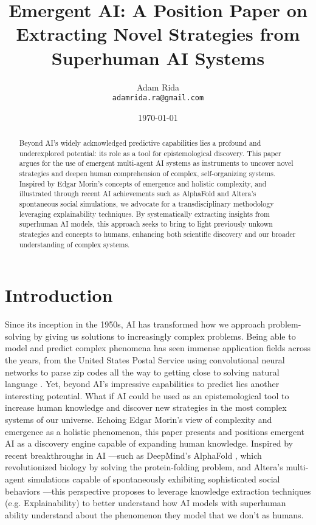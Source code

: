 \documentclass[11pt]{article}
\title{\textbf{Emergent AI: A Position Paper on Extracting Novel Strategies from Superhuman AI Systems}}
\author{Adam Rida \\ \small{\texttt{adamrida.ra@gmail.com}}}
\date{\today}
\begin{document}
\maketitle

\begin{abstract}
Beyond AI’s widely acknowledged predictive capabilities lies a profound and underexplored potential: its role as a tool for epistemological discovery. This paper argues for the use of emergent multi-agent AI systems as instruments to uncover novel strategies and deepen human comprehension of complex, self-organizing systems. Inspired by Edgar Morin's concepts of emergence and holistic complexity, and illustrated through recent AI achievements such as AlphaFold \cite{alphafold} and Altera's \cite{altera} spontaneous social simulations, we advocate for a transdisciplinary methodology leveraging explainability techniques. By systematically extracting insights from superhuman AI models, this approach seeks to bring to light previously unkown strategies and concepts to humans, enhancing both scientific discovery and our broader understanding of complex systems.
\end{abstract}

\section{Introduction}
Since its inception in the 1950s, AI has transformed how we approach problem-solving by giving us solutions to increasingly complex problems. Being able to model and predict complex phenomena has seen immense application fields across the years, from the United States Postal Service using convolutional neural networks \cite{uspscnn} to parse zip codes all the way to getting close to solving natural language \cite{nltp}.
Yet, beyond AI's impressive capabilities to predict lies another interesting potential. What if AI could be used as an epistemological tool to increase human knowledge and discover new strategies in the most complex systems of our universe. Echoing Edgar Morin's \cite{morin} view of complexity and emergence as a holistic phenomenon, this paper presents and positions emergent AI as a discovery engine capable of expanding human knowledge.
Inspired by recent breakthroughs in AI —such as DeepMind's AlphaFold \cite{alphafold}, which revolutionized biology by solving the protein-folding problem, and Altera's multi-agent simulations capable of spontaneously exhibiting sophisticated social behaviors \cite{altera}—this perspective proposes to leverage knowledge extraction techniques (e.g. Explainability) to better understand how AI models with superhuman ability understand about the phenomenon they model that we don't as humans.
\end{document}
